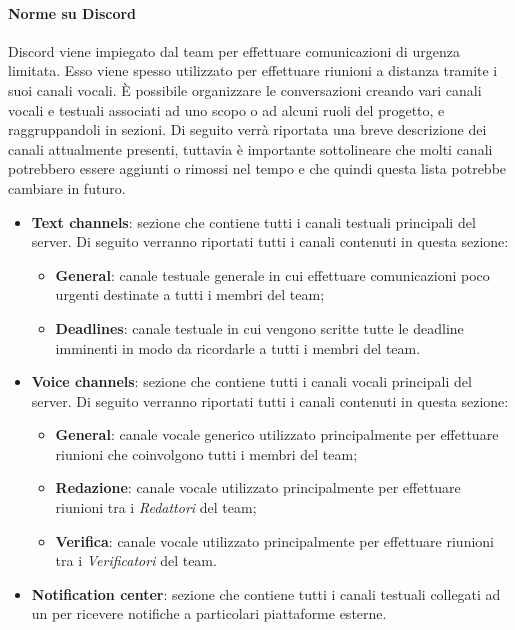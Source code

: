 \paragraph{Norme su Discord}\Spazio
 Discord viene impiegato dal team per effettuare comunicazioni di urgenza limitata. Esso viene spesso utilizzato per effettuare riunioni a distanza tramite i suoi canali vocali. 
 È possibile organizzare le conversazioni creando vari canali vocali e testuali associati ad uno scopo o ad alcuni ruoli del progetto, e raggruppandoli in sezioni. Di seguito verrà riportata una breve descrizione dei canali attualmente presenti, tuttavia è importante sottolineare che molti canali potrebbero essere aggiunti o rimossi nel tempo e che quindi questa lista potrebbe cambiare in futuro.\newline
 \begin{itemize}
	\item{\textbf{Text channels}: sezione che contiene tutti i canali testuali principali del server. Di seguito verranno riportati tutti i canali contenuti in questa sezione:
		\begin{itemize}
			\item{\textbf{General}: canale testuale generale in cui effettuare comunicazioni poco urgenti destinate a tutti i membri del team;}
			\item{\textbf{Deadlines}: canale testuale in cui vengono scritte tutte le deadline imminenti in modo da ricordarle a tutti i membri del team.}
		\end{itemize}
	}
	\item{\textbf{Voice channels}: sezione che contiene tutti i canali vocali principali del server. Di seguito verranno riportati tutti i canali contenuti in questa sezione:
		\begin{itemize}
			\item{\textbf{General}: canale vocale generico utilizzato principalmente per effettuare riunioni che coinvolgono tutti i membri del team;}
			\item{\textbf{Redazione}: canale vocale utilizzato principalmente per effettuare riunioni tra i \emph{Redattori} del team;}
			\item{\textbf{Verifica}: canale vocale utilizzato principalmente per effettuare riunioni tra i \emph{Verificatori} del team.}
		\end{itemize}
	}
	\item{\textbf{Notification center}: sezione che contiene tutti i canali testuali collegati ad un  per ricevere notifiche a particolari piattaforme esterne.
}
\end{itemize}
